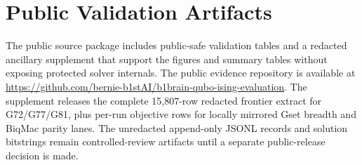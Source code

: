 \documentclass[11pt]{article}
\begin{document}
\clearpage
\appendix
\section{Public Validation Artifacts}
The public source package includes public-safe validation tables and a redacted ancillary supplement that support the figures and summary tables without exposing protected solver internals. The public evidence repository is available at \url{https://github.com/bernie-b1stAI/b1brain-qubo-ising-evaluation}. The supplement releases the complete 15,807-row redacted frontier extract for G72/G77/G81, plus per-run objective rows for locally mirrored Gset breadth and BiqMac parity lanes. The unredacted append-only JSONL records and solution bitstrings remain controlled-review artifacts until a separate public-release decision is made.
\end{document}
